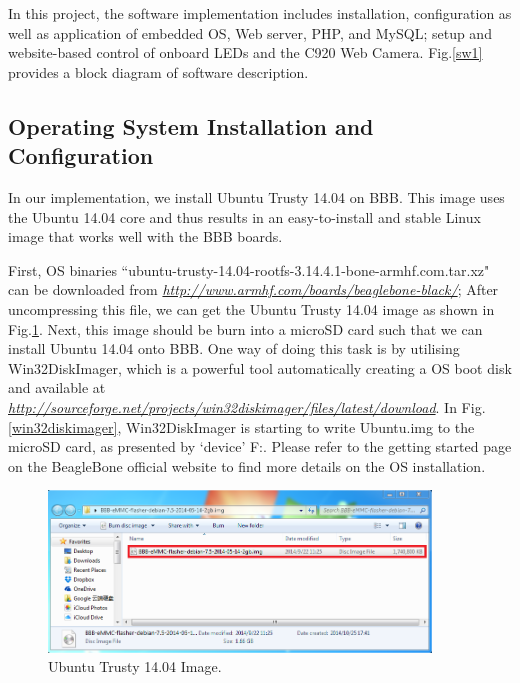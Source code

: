 \documentclass[12pt,journal,draftclsnofoot,onecolumn]{IEEEtran}
\begin{document}
In this project, the software implementation includes installation, configuration as well as application of embedded OS, Web server, PHP, and MySQL; setup and website-based control of onboard LEDs and the C920 Web Camera. Fig.\ref{sw1} provides a block diagram of software description.

	\subsection{Operating System Installation and Configuration}\label{Sys}
	In our implementation, we install Ubuntu Trusty 14.04 on BBB. This image uses the Ubuntu 14.04 core and thus  results  in an easy-to-install and stable Linux image that works well with the BBB boards.

First, OS binaries ``ubuntu-trusty-14.04-rootfs-3.14.4.1-bone-armhf.com.tar.xz" can be downloaded from \textcolor{blue}{\textit{\url{http://www.armhf.com/boards/beaglebone-black/}}}; After uncompressing this file, we can get the Ubuntu Trusty 14.04 image as shown in Fig.\ref{osimage}. Next, this image should be burn into a microSD card such that we can install Ubuntu 14.04 onto BBB. One way of doing this task is by utilising Win32DiskImager, which is a powerful tool automatically creating a OS boot disk and available at \textcolor{blue}{\textit{\url{http://sourceforge.net/projects/win32diskimager/files/latest/download}}}. In Fig.\ref{win32diskimager}, Win32DiskImager is starting to write Ubuntu.img to the microSD card, as presented by `device' F:. Please refer to the getting started page on the BeagleBone official website \cite{startBB} to find more details on the OS installation.

\begin{figure}[htb]
	\centering
	\includegraphics[width=4in]{./figs/osimage.PNG}
	\caption{Ubuntu Trusty 14.04 Image.}
	\label{osimage}
\end{figure}
\end{document}
